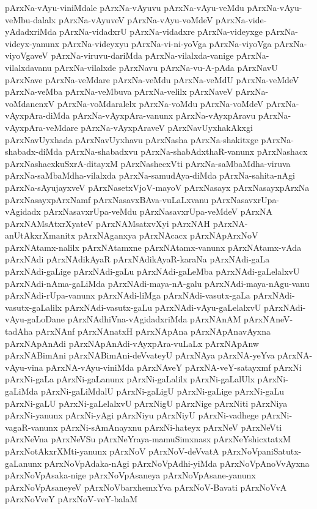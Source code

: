 {pArxNa-vAyu-viniMdale
pArxNa-vAyuvu
pArxNa-vAyu-veMdu
pArxNa-vAyu-veMbu-dalalx
pArxNa-vAyuveV
pArxNa-vAyu-voMdeV
pArxNa-vide-yAdadxriMda
pArxNa-vidadxrU
pArxNa-vidadxre
pArxNa-videyxge
pArxNa-videyx-yanunx
pArxNa-videyxyu
pArxNa-vi-ni-yoVga
pArxNa-viyoVga
pArxNa-viyoVgaveV
pArxNa-viruvu-dariMda
pArxNa-vilalxda-vanige
pArxNa-vilalxdavanu
pArxNa-vilalxde
pArxNavu
pArxNa-vu-A-pAda
pArxNavU
pArxNave
pArxNa-veMdare
pArxNa-veMdu
pArxNa-veMdU
pArxNa-veMdeV
pArxNa-veMba
pArxNa-veMbuva
pArxNa-velilx
pArxNaveV
pArxNa-voMdanenxV
pArxNa-voMdaralelx
pArxNa-voMdu
pArxNa-voMdeV
pArxNa-vAyxpAra-diMda
pArxNa-vAyxpAra-vanunx
pArxNa-vAyxpAravu
pArxNa-vAyxpAra-veMdare
pArxNa-vAyxpAraveV
pArxNavUyxhakAkxgi
pArxNavUyxhada
pArxNavUyxhavu
pArxNasha
pArxNa-shakitxge
pArxNa-shabadx-diMda
pArxNa-shabadxvu
pArxNa-shabAdxthaR-vanunx
pArxNashacx
pArxNashacxkuSxrA-ditayxM
pArxNashecxVti
pArxNa-saMbaMdha-viruva
pArxNa-saMbaMdha-vilalxda
pArxNa-samudAya-diMda
pArxNa-sahita-nAgi
pArxNa-sAyujayxveV
pArxNasetxVjoV-mayoV
pArxNasayx
pArxNasayxpArxNa
pArxNasayxpArxNamf
pArxNasavxBAva-vuLaLxvanu
pArxNasavxrUpa-vAgidadx
pArxNasavxrUpa-veMdu
pArxNasavxrUpa-veMdeV
pArxNA
pArxNAMsAtxrXyateV
pArxNAMsatxvXyi
pArxNAH
pArxNA-anUtAkxrXmanitx
pArxNAganxya
pArxNAcacx
pArxNApArxNoV
pArxNAtamx-nalilx
pArxNAtamxne
pArxNAtamx-vanunx
pArxNAtamx-vAda
pArxNAdi
pArxNAdikAyaR
pArxNAdikAyaR-karaNa
pArxNAdi-gaLa
pArxNAdi-gaLige
pArxNAdi-gaLu
pArxNAdi-gaLeMba
pArxNAdi-gaLelalxvU
pArxNAdi-nAma-gaLiMda
pArxNAdi-maya-nA-galu
pArxNAdi-maya-nAgu-vanu
pArxNAdi-rUpa-vanunx
pArxNAdi-liMga
pArxNAdi-vasutx-gaLa
pArxNAdi-vasutx-gaLalilx
pArxNAdi-vasutx-gaLu
pArxNAdi-vAyu-gaLelalxvU
pArxNAdi-vAyu-gaLoDane
pArxNAdhiVna-vAgidadxriMda
pArxNAnAM
pArxNAneV-tadAha
pArxNAnf
pArxNAnatxH
pArxNApAna
pArxNApAnavAyxna
pArxNApAnAdi
pArxNApAnAdi-vAyxpAra-vuLaLx
pArxNApAnw
pArxNABimAni
pArxNABimAni-deVvateyU
pArxNAya
pArxNA-yeYva
pArxNA-vAyu-vina
pArxNA-vAyu-viniMda
pArxNAveY
pArxNA-veY-satayxmf
pArxNi
pArxNi-gaLa
pArxNi-gaLanunx
pArxNi-gaLalilx
pArxNi-gaLalUlx
pArxNi-gaLiMda
pArxNi-gaLiMdalU
pArxNi-gaLigU
pArxNi-gaLige
pArxNi-gaLu
pArxNi-gaLU
pArxNi-gaLelalxvU
pArxNigU
pArxNige
pArxNiti
pArxNiya
pArxNi-yanunx
pArxNi-yAgi
pArxNiyu
pArxNiyU
pArxNi-vadhege
pArxNi-vagaR-vanunx
pArxNi-sAmAnayxnu
pArxNi-hateyx
pArxNeV
pArxNeVti
pArxNeVna
pArxNeVSu
pArxNeYraya-mamuSimxnasx
pArxNeYshicxtatxM
pArxNotAkxrXMti-yanunx
pArxNoV
pArxNoV-deVvatA
pArxNoVpaniSatutx-gaLanunx
pArxNoVpAdaka-nAgi
pArxNoVpAdhi-yiMda
pArxNoVpAnoVvAyxna
pArxNoVpAsaka-nige
pArxNoVpAsaneya
pArxNoVpAsane-yanunx
pArxNoVpAsaneyeV
pArxNoVbarxhemxYva
pArxNoV-Bavati
pArxNoVvA
pArxNoVveY
pArxNoV-veY-balaM
}
